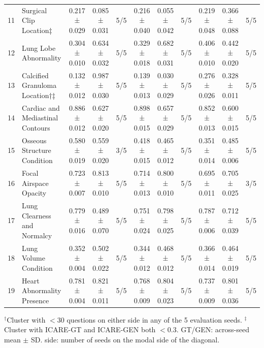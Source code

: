 \begin{table}[t]
\begin{tabular}{llccccccccc}
11 & Surgical Clip Location‡ & 0.217 ± 0.029 & 0.085 ± 0.031 & 5/5 & 0.216 ± 0.040 & 0.055 ± 0.042 & 5/5 & 0.219 ± 0.048 & 0.366 ± 0.088 & 5/5 \\
12 & Lung Lobe Abnormality & 0.304 ± 0.010 & 0.634 ± 0.032 & 5/5 & 0.329 ± 0.018 & 0.682 ± 0.031 & 5/5 & 0.406 ± 0.010 & 0.442 ± 0.020 & 5/5 \\
13 & Calcified Granuloma Location†‡ & 0.132 ± 0.012 & 0.987 ± 0.030 & 5/5 & 0.139 ± 0.013 & 0.030 ± 0.029 & 5/5 & 0.276 ± 0.026 & 0.328 ± 0.011 & 5/5 \\
14 & Cardiac and Mediastinal Contours & 0.886 ± 0.012 & 0.627 ± 0.020 & 5/5 & 0.898 ± 0.015 & 0.657 ± 0.029 & 5/5 & 0.852 ± 0.013 & 0.600 ± 0.015 & 5/5 \\
15 & Osseous Structure Condition & 0.580 ± 0.019 & 0.559 ± 0.020 & 3/5 & 0.418 ± 0.015 & 0.465 ± 0.012 & 5/5 & 0.351 ± 0.014 & 0.485 ± 0.006 & 5/5 \\
16 & Focal Airspace Opacity & 0.723 ± 0.007 & 0.813 ± 0.010 & 5/5 & 0.714 ± 0.013 & 0.800 ± 0.010 & 5/5 & 0.695 ± 0.011 & 0.705 ± 0.025 & 3/5 \\
17 & Lung Clearness and Normalcy & 0.779 ± 0.016 & 0.489 ± 0.070 & 5/5 & 0.751 ± 0.024 & 0.798 ± 0.025 & 5/5 & 0.787 ± 0.006 & 0.712 ± 0.039 & 5/5 \\
18 & Lung Volume Condition & 0.352 ± 0.004 & 0.502 ± 0.022 & 5/5 & 0.344 ± 0.012 & 0.468 ± 0.012 & 5/5 & 0.366 ± 0.014 & 0.464 ± 0.019 & 5/5 \\
19 & Heart Abnormality Presence & 0.781 ± 0.004 & 0.821 ± 0.011 & 5/5 & 0.768 ± 0.009 & 0.804 ± 0.023 & 5/5 & 0.737 ± 0.009 & 0.801 ± 0.036 & 5/5 \\
\bottomrule
\end{tabular}
\begin{flushleft}\footnotesize
$^\dagger$Cluster with $<$30 questions on either side in any of the 5 evaluation seeds. 
$^\ddagger$Cluster with ICARE-GT and ICARE-GEN both $<$0.3. 
GT/GEN: across-seed mean $\pm$ SD. side: number of seeds on the modal side of the diagonal.
\end{flushleft}
\end{table}

